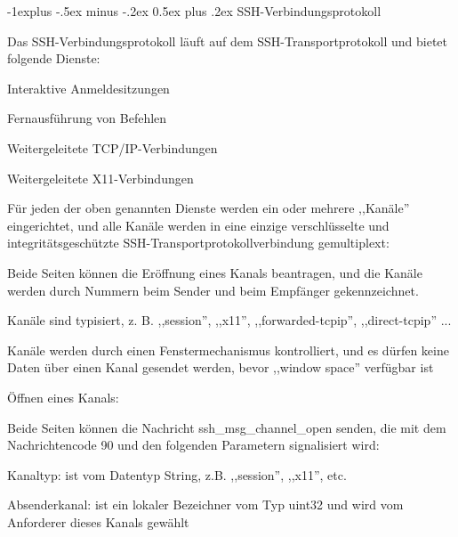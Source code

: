 \documentclass[a4paper]{article}
\makeatletter
\renewcommand{\subsection}{\@startsection{subsection}{2}{0mm}%
 {-1explus -.5ex minus -.2ex}%
 {0.5ex plus .2ex}%
 {\normalfont\normalsize\bfseries}}
\makeatother
\begin{document}
\begin{multicols}{3}
      \subsection{SSH-Verbindungsprotokoll}
      \begin{itemize*}
            \item Das SSH-Verbindungsprotokoll läuft auf dem SSH-Transportprotokoll und bietet folgende Dienste:
            \begin{itemize*}
                  \item Interaktive Anmeldesitzungen
                  \item Fernausführung von Befehlen
                  \item Weitergeleitete TCP/IP-Verbindungen
                  \item Weitergeleitete X11-Verbindungen
            \end{itemize*}
            \item Für jeden der oben genannten Dienste werden ein oder mehrere ,,Kanäle'' eingerichtet, und alle Kanäle werden in eine einzige verschlüsselte und integritätsgeschützte SSH-Transportprotokollverbindung gemultiplext:
            \begin{itemize*}
                  \item Beide Seiten können die Eröffnung eines Kanals beantragen, und die Kanäle werden durch Nummern beim Sender und beim Empfänger gekennzeichnet.
                  \item Kanäle sind typisiert, z. B. ,,session'', ,,x11'', ,,forwarded-tcpip'', ,,direct-tcpip'' ...
                  \item Kanäle werden durch einen Fenstermechanismus kontrolliert, und es dürfen keine Daten über einen Kanal gesendet werden, bevor ,,window space'' verfügbar ist
            \end{itemize*}
            \item Öffnen eines Kanals:
            \begin{itemize*}
                  \item Beide Seiten können die Nachricht ssh\_msg\_channel\_open senden, die mit dem Nachrichtencode 90 und den folgenden Parametern signalisiert wird:
                  \begin{itemize*}
                        \item Kanaltyp: ist vom Datentyp String, z.B. ,,session'', ,,x11'', etc.
                        \item Absenderkanal: ist ein lokaler Bezeichner vom Typ uint32 und wird vom Anforderer dieses Kanals gewählt

\end{itemize*}
\end{itemize*}
\end{itemize*}
\end{multicols}
\end{document}
